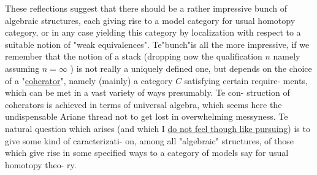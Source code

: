 
These reflections suggest that there should be a rather impressive
bunch of algebraic structures,  each giving rise to a model category
for  usual homotopy category,  or in any case yielding this category by
localization with respect to a suitable notion of "weak equivalences".
Te"bunch"is all the more impressive,  if we remember that the notion
of a stack  (dropping now the qualification $n$ namely assuming $n=\infty$ )  is
not really a uniquely defined one,  but depends on the choice of a
"\uline{coherator}",  namely (mainly) a category $C$ satisfying certain require-%
ments,  which can be met in a vast variety of ways\hand{,} presumably.  Te con-%
struction of coherators is achieved in terms of universal algebra,
which seems here the undispensable Ariane thread not to get lost in
overwhelming messyness.  Te natural question which arises (and which I
\uline{do not feel though like pursuing})\hand{\unsure{//}} is to give some kind of caracterizati-%
on,  among all "algebraic" structures,  of those which give rise in
some specified ways to a category of models say for usual homotopy theo-%
ry.

